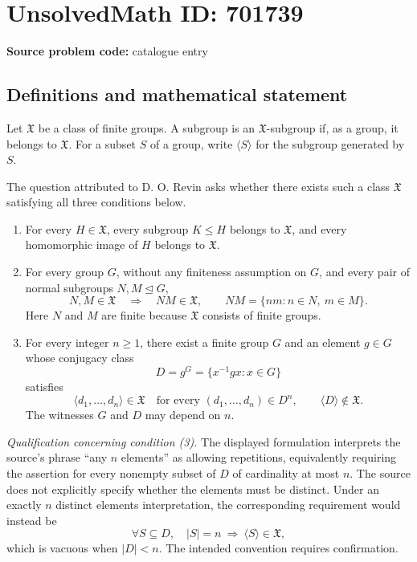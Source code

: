 \documentclass[11pt]{article}
\begin{document}
\section*{UnsolvedMath ID: 701739}
\textbf{Source problem code:} catalogue entry
\subsection{Definitions and mathematical statement}
Let \(\mathfrak X\) be a class of finite groups. A subgroup is an \(\mathfrak X\)-subgroup if, as a group, it belongs to \(\mathfrak X\). For a subset \(S\) of a group, write \(\langle S\rangle\) for the subgroup generated by \(S\).

The question attributed to D. O. Revin asks whether there exists such a class \(\mathfrak X\) satisfying all three conditions below.
\begin{enumerate}
\item For every \(H\in\mathfrak X\), every subgroup \(K\le H\) belongs to \(\mathfrak X\), and every homomorphic image of \(H\) belongs to \(\mathfrak X\).
\item For every group \(G\), without any finiteness assumption on \(G\), and every pair of normal subgroups \(N,M\trianglelefteq G\),
\[
N,M\in\mathfrak X\quad\Longrightarrow\quad NM\in\mathfrak X,
\qquad NM=\{nm:n\in N,\ m\in M\}.
\]
Here \(N\) and \(M\) are finite because \(\mathfrak X\) consists of finite groups.
\item For every integer \(n\ge1\), there exist a finite group \(G\) and an element \(g\in G\) whose conjugacy class
\[
D=g^G=\{x^{-1}gx:x\in G\}
\]
satisfies
\[
\langle d_1,\ldots,d_n\rangle\in\mathfrak X
\quad\text{for every }(d_1,\ldots,d_n)\in D^n,
\qquad
\langle D\rangle\notin\mathfrak X.
\]
The witnesses \(G\) and \(D\) may depend on \(n\).
\end{enumerate}

\textit{Qualification concerning condition (3).} The displayed formulation interprets the source's phrase ``any \(n\) elements'' as allowing repetitions, equivalently requiring the assertion for every nonempty subset of \(D\) of cardinality at most \(n\). The source does not explicitly specify whether the elements must be distinct. Under an exactly \(n\) distinct elements interpretation, the corresponding requirement would instead be
\[
\forall S\subseteq D,\quad |S|=n\ \Longrightarrow\ \langle S\rangle\in\mathfrak X,
\]
which is vacuous when \(|D|<n\). The intended convention requires confirmation.
\end{document}
